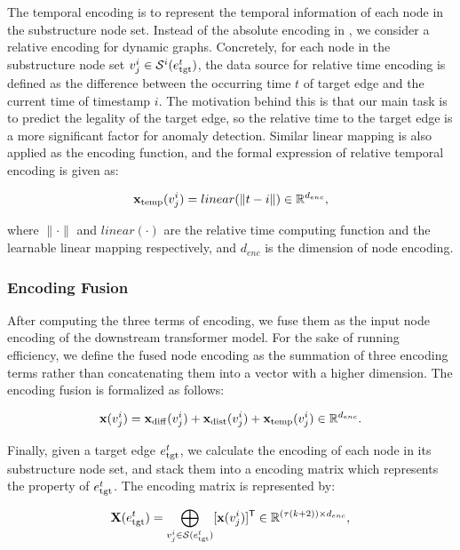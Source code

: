 \documentclass[10pt,journal,compsoc]{IEEEtran}
\newcommand{\HL}{}
\begin{document}
The temporal encoding is to represent the temporal information of each node in the substructure node set. Instead of the absolute encoding in \cite{vaswani2017attention}, we consider a relative encoding for dynamic graphs. Concretely, for each node in the substructure node set $v_j^i \in \mathcal{S}^i(e^t_{\rm tgt})$, the data source for relative time encoding is defined as the difference between the occurring time $t$ of target edge and the current time of timestamp $i$. The motivation behind this is that our main task is to predict the legality of the target edge, so the relative time to the target edge is a more significant factor for anomaly detection. Similar linear mapping is also applied as the encoding function, and the formal expression of relative temporal encoding is given as:

\begin{equation}
\label{eq:temp_enc}
\mathbf{x}_{\rm temp}(v_j^i)= linear(\|t-i\|) \in \mathbb{R}^{d_{enc}},
\end{equation}

\noindent where $\|\cdot\|$ and $linear(\cdot)$ are the relative time computing function and the learnable linear mapping respectively, and $d_{enc}$ is the dimension of node encoding. 

\subsubsection{Encoding Fusion} \label{subsec:encoding_fusion}

After computing the three terms of encoding, we fuse them \HL{as} the input node encoding of the downstream transformer model. For the sake of running efficiency, we define the fused node encoding as the summation of three encoding terms rather than concatenating them into a vector with a higher dimension. The encoding fusion is formalized as follows:

\begin{equation}
\label{eq:fused_enc}
\mathbf{x}(v_j^i)= \mathbf{x}_{\rm diff}(v_j^i) + \mathbf{x}_{\rm dist}(v_j^i) + \mathbf{x}_{\rm temp}(v_j^i) \in \mathbb{R}^{d_{enc}}.
\end{equation}

Finally, given a target edge $e^t_{\rm tgt}$, we calculate the encoding of each node in its substructure node set, and stack them into a encoding matrix which represents the property of $e^t_{\rm tgt}$. The encoding matrix is represented by:

\begin{equation}
\label{eq:concat}
\HL{\mathbf{X}(e^t_{\rm tgt}) = \bigoplus\limits_{v_j^i \in \mathcal{S}(e_{\rm tgt}^t)} [\mathbf{x}(v_j^i)]^\mathsf{T} \in \mathbb{R}^{(\tau (k + 2)) \times d_{enc}},}
\end{equation}
\end{document}
